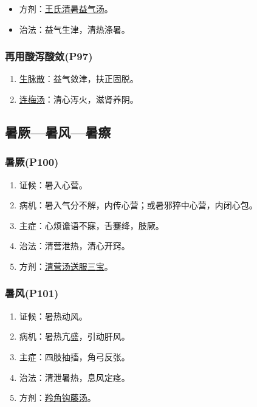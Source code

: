 \documentclass[cn,black,12pt,founder,normal,twocolumn]{elegantnote}
\begin{document}
\begin{itemize}
    \item 方剂：\uline{王氏清暑益气汤}。
    \item 治法：益气生津，清热涤暑。
\end{itemize}

\subsubsection{再用酸泻酸敛(P97)}

\begin{enumerate}
    \item \uline{生脉散}：益气敛津，扶正固脱。
    \item \uline{连梅汤}：清心泻火，滋肾养阴。
\end{enumerate}

\subsection{暑厥—暑风—暑瘵}

\subsubsection{暑厥(P100)}

\begin{enumerate}
    \item 证候：暑入心营。
    \item 病机：暑入气分不解，内传心营；或暑邪猝中心营，内闭心包。
    \item 主症：心烦谵语不寐，舌蹇绛，肢厥。
    \item 治法：清营泄热，清心开窍。
    \item 方剂：\uline{清营汤送服三宝}。
\end{enumerate}

\subsubsection{暑风(P101)}

\begin{enumerate}
    \item 证候：暑热动风。
    \item 病机：暑热亢盛，引动肝风。
    \item 主症：四肢抽搐，角弓反张。
    \item 治法：清泄暑热，息风定痉。
    \item 方剂：\uline{羚角钩藤汤}。
\end{enumerate}
\end{document}
